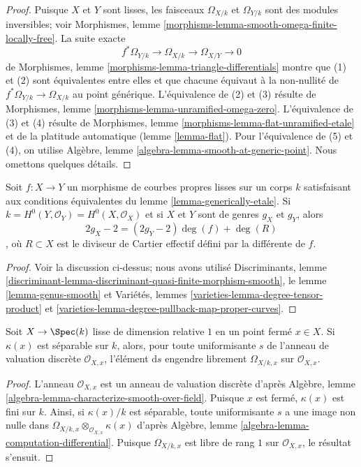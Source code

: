 \begin{proof}
Puisque $X$ et $Y$ sont lisses, les faisceaux $\Omega_{X/k}$ et $\Omega_{Y/k}$ sont des modules inversibles; voir Morphismes, lemme \ref{morphisms-lemma-smooth-omega-finite-locally-free}. La suite exacte $$
f^*\Omega_{Y/k} \longrightarrow \Omega_{X/k}
\longrightarrow \Omega_{X/Y} \longrightarrow 0
$$ de Morphismes, lemme \ref{morphisms-lemma-triangle-differentials} montre que (1) et (2) sont équivalentes entre elles et que chacune équivaut à la non-nullité de $f^*\Omega_{Y/k} \to \Omega_{X/k}$ au point générique. L'équivalence de (2) et (3) résulte de Morphismes, lemme \ref{morphisms-lemma-unramified-omega-zero}. L'équivalence de (3) et (4) résulte de Morphismes, lemme \ref{morphisms-lemma-flat-unramified-etale} et de la platitude automatique (lemme \ref{lemma-flat}). Pour l'équivalence de (5) et (4), on utilise Algèbre, lemme \ref{algebra-lemma-smooth-at-generic-point}. Nous omettons quelques détails.
\end{proof}

\begin{lemma}
\label{lemma-rh}
Soit $f : X \to Y$ un morphisme de courbes propres lisses sur un corps $k$ satisfaisant aux conditions équivalentes du lemme \ref{lemma-generically-etale}. Si $k = H^0(Y, \mathcal{O}_Y) = H^0(X, \mathcal{O}_X)$ et si $X$ et $Y$ sont de genres $g_X$ et $g_Y$, alors $$
2g_X - 2 = (2g_Y - 2) \deg(f) + \deg(R)
$$, où $R \subset X$ est le diviseur de Cartier effectif défini par la différente de $f$.
\end{lemma}

\begin{proof}
Voir la discussion ci-dessus; nous avons utilisé Discriminants, lemme \ref{discriminant-lemma-discriminant-quasi-finite-morphism-smooth}, le lemme \ref{lemma-genus-smooth} et Variétés, lemmes \ref{varieties-lemma-degree-tensor-product} et \ref{varieties-lemma-degree-pullback-map-proper-curves}.
\end{proof}

\begin{lemma}
\label{lemma-uniformizer-works}
Soit $X \to \Spec(k)$ lisse de dimension relative $1$ en un point fermé $x \in X$. Si $\kappa(x)$ est séparable sur $k$, alors, pour toute uniformisante $s$ de l'anneau de valuation discrète $\mathcal{O}_{X, x}$, l'élément $\text{d}s$ engendre librement $\Omega_{X/k, x}$ sur $\mathcal{O}_{X, x}$.
\end{lemma}

\begin{proof}
L'anneau $\mathcal{O}_{X, x}$ est un anneau de valuation discrète d'après Algèbre, lemme \ref{algebra-lemma-characterize-smooth-over-field}. Puisque $x$ est fermé, $\kappa(x)$ est fini sur $k$. Ainsi, si $\kappa(x)/k$ est séparable, toute uniformisante $s$ a une image non nulle dans $\Omega_{X/k, x} \otimes_{\mathcal{O}_{X, x}} \kappa(x)$ d'après Algèbre, lemme \ref{algebra-lemma-computation-differential}. Puisque $\Omega_{X/k, x}$ est libre de rang $1$ sur $\mathcal{O}_{X, x}$, le résultat s'ensuit.
\end{proof}

